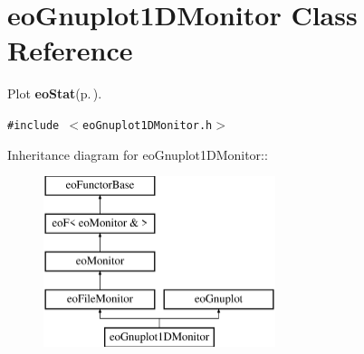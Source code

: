 \section{eo\-Gnuplot1DMonitor Class Reference}
\label{classeo_gnuplot1_d_monitor}
Plot {\bf eo\-Stat}{\rm (p.\,\pageref{classeo_stat})}.  


{\tt \#include $<$eo\-Gnuplot1DMonitor.h$>$}

Inheritance diagram for eo\-Gnuplot1DMonitor::\begin{figure}[H]
\begin{center}
\leavevmode
\includegraphics[height=5cm]{classeo_gnuplot1_d_monitor}
\end{center}
\end{figure}
